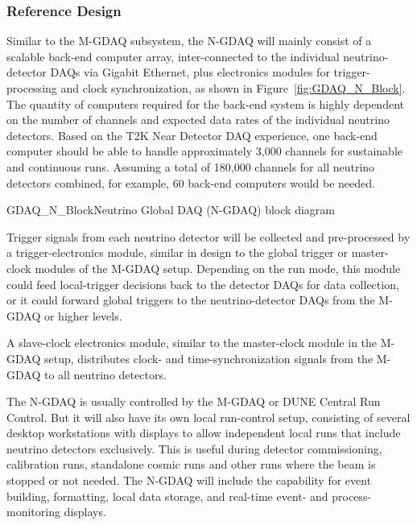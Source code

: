 \subsubsection{Reference Design}

Similar to the M-GDAQ subsystem, the N-GDAQ will 
mainly consist of a scalable back-end computer array, inter-connected to 
the individual neutrino-detector DAQs via Gigabit Ethernet, plus electronics 
modules for trigger-processing and clock synchronization, as shown in Figure~\ref{fig:GDAQ_N_Block}. The %
quantity of 
computers required for the back-end system is highly dependent on the 
number of channels and expected data rates of the individual %
neutrino detectors. Based on the T2K Near Detector DAQ experience, one back-end computer 
should be able to handle approximately 3,000 channels for sustainable and 
continuous runs. Assuming a total of 180,000 channels for all %
neutrino detectors combined, for example, 60 back-end computers  would be needed.

\begin{cdrfigure}{GDAQ_N_Block}{Neutrino Global DAQ (N-GDAQ) block 
diagram}
\end{cdrfigure}

Trigger signals from each neutrino detector will be collected and 
pre-processed by a trigger-electronics module, similar in design to the 
global trigger or master-clock modules %
of the M-GDAQ setup. Depending on the run mode, this module could feed 
local-trigger decisions back to the detector DAQs for data collection, or 
it could
forward global triggers to the neutrino-detector DAQs from the M-GDAQ or 
higher levels.

A slave-clock electronics module, similar to the master-clock module in 
the M-GDAQ setup, distributes clock- and time-synchronization signals 
from the M-GDAQ to all neutrino detectors.

The N-GDAQ is usually controlled by the %
M-GDAQ  %
or DUNE Central Run 
Control.  But it will also have its own local run-control setup, 
consisting of several desktop workstations with displays to allow 
independent local runs 
that include %
neutrino  detectors exclusively. This is useful during detector commissioning, calibration 
runs, standalone cosmic runs and other runs where the beam is stopped or 
not needed. %
The N-GDAQ will include the capability for event building, 
formatting, local data storage, and real-time event- and process-monitoring displays.


